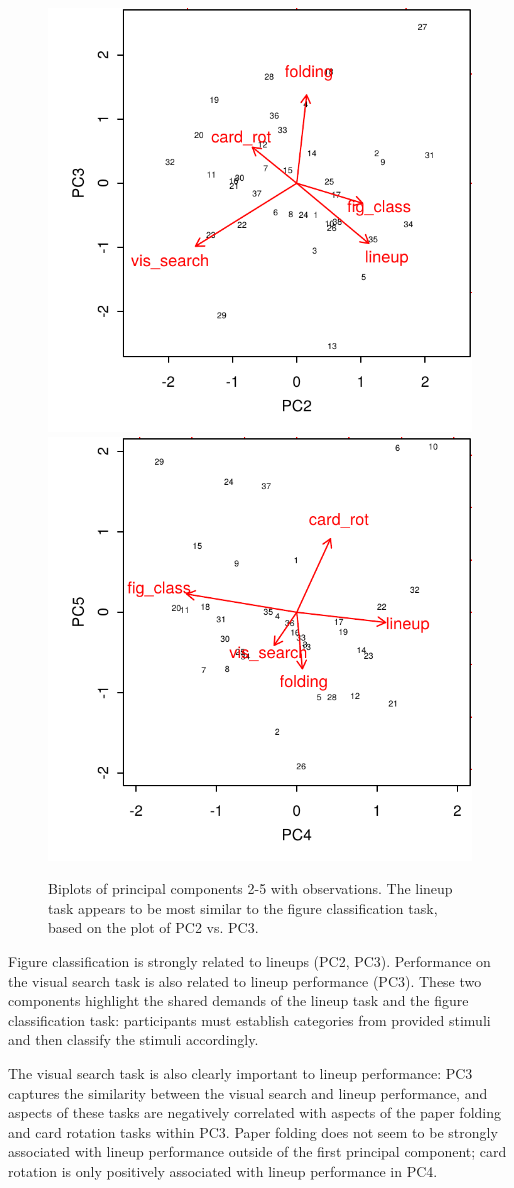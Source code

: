 \documentclass[11pt]{isuthesis}\usepackage[]{graphicx}\usepackage[]{color}
\newenvironment{knitrout}{}{} %
\begin{document}
\begin{knitrout}
\color{fgcolor}\begin{figure}

{\centering \includegraphics[width=.45\linewidth]{Figure/VisualAptitude/fig-biplots-pca5-1} 
\includegraphics[width=.45\linewidth]{Figure/VisualAptitude/fig-biplots-pca5-2} 

}

\caption[Biplots of principal components 2-5 with observations.]{Biplots of principal components 2-5 with observations. The lineup task appears to be most similar to the figure classification task, based on the plot of PC2 vs. PC3.  \label{fig:biplots5}}\label{fig:biplots-pca5}
\end{figure}


\end{knitrout}

Figure classification is strongly related to lineups (PC2, PC3). Performance on the visual search task  is also related to lineup performance (PC3). These two components highlight the shared demands of the lineup task and the figure classification task: participants must establish categories from provided stimuli and then classify the stimuli accordingly. 

The visual search task is also clearly important to lineup performance: PC3 captures the similarity between the visual search and lineup performance, and aspects of these tasks are negatively correlated with aspects of the paper folding and card rotation tasks within PC3. Paper folding does not seem to be strongly associated with lineup performance outside of the first principal component; card rotation is only positively associated with lineup performance in PC4.
\end{document}
